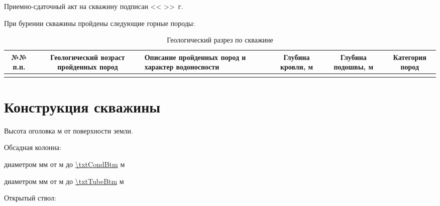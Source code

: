 	\bigskip
	
	Приемно-сдаточный акт на скважину подписан << \underline{\hspace{0.7cm}} >> \underline{\hspace{3cm}} \txtYear \,г.	
	
	\pagebreak
	
	При бурении скважины пройдены следующие горные породы:

	\begin{table}[!h]\footnotesize
	\centering
	\caption{Геологический разрез по скважине}
	\begin{tabulary}{\textwidth}{|C|C|L|C|C|C|}
	\hline 
	№№ п.п. & Геологический возраст пройденных пород & Описание пройденных пород и характер водоносности & Глубина кровли, м & Глубина подошвы, м & Категория пород \\ 
	\hline 
	\txtGeological  %
	\end{tabulary} 
	\end{table}

	\section{Конструкция скважины}

	Высота оголовка	\underline{\txtOgolovok} м	от поверхности земли. 
	
	\bigskip

	Обсадная колонна:

	диаметром \underline{\txtCondDiam} мм от \underline{\txtOgolovok} м до \underline{\num{\txtCondBtm}}  м  		
	
	диаметром \underline{\txtTubeDiam} мм от \underline{\txtOgolovok} м до \underline{\num{\txtTubeBtm}} м
	
	\bigskip

	Открытый ствол:

